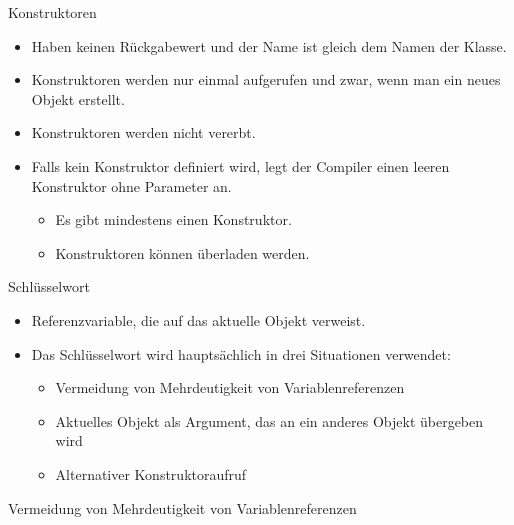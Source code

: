 \documentclass{../tuda-beamer}
\begin{document}
  \begin{frame}{Konstruktoren}
    \begin{itemize}
      \item Haben keinen Rückgabewert und der Name ist gleich dem Namen der Klasse.
      \item Konstruktoren werden nur einmal aufgerufen und zwar, wenn man ein neues Objekt erstellt.
      \item Konstruktoren werden nicht vererbt.
      \item Falls kein Konstruktor definiert wird, legt der Compiler einen leeren Konstruktor ohne
      Parameter an.
      \begin{itemize}
        \item Es gibt mindestens einen Konstruktor.
        \item Konstruktoren können überladen werden.
      \end{itemize}

      
    \end{itemize}
  \end{frame}

  \begin{frame}[c]
    
  \end{frame}

  \begin{frame}{Schlüsselwort }
    \begin{itemize}
      \item Referenzvariable, die auf das aktuelle Objekt verweist.
      \item Das Schlüsselwort  wird hauptsächlich in drei Situationen verwendet:
      \begin{itemize}
        \item Vermeidung von Mehrdeutigkeit von Variablenreferenzen
        \item Aktuelles Objekt als Argument, das an ein anderes Objekt übergeben wird
        \item Alternativer Konstruktoraufruf
      \end{itemize}
    \end{itemize}
  \end{frame}

  \begin{frame}{Vermeidung von Mehrdeutigkeit von Variablenreferenzen}
    
  \end{frame}
\end{document}
